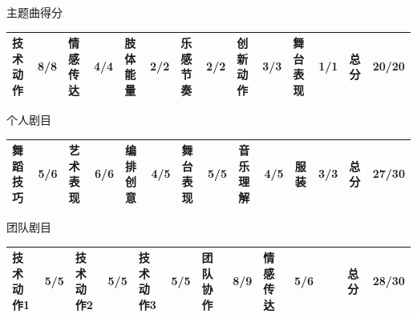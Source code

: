 \documentclass{article}
\begin{document}
\begin{CJK*}{UTF8}{gbsn}
\begin{center}
\vspace{0.5cm}

主题曲得分  
\vspace{0.3cm}

\begin{tabular}{|>{\normalsize}p{}>{\normalsize}p{}|>{\normalsize}p{}>{\normalsize}p{}|>{\normalsize}p{}>{\normalsize}p{}|>{\normalsize}p{}>{\normalsize}p{}|>{\normalsize}p{}>{\normalsize}p{}|>{\normalsize}p{}>{\normalsize}p{}|>{\normalsize}p{}>{\normalsize}p{}|}
    \hline
    \rule{0pt}{2.5ex} 技术动作 & 8/8 & 情感传达 & 4/4 & 肢体能量 & 2/2 & 乐感节奏 & 2/2 & 创新动作 & 3/3 & 舞台表现 & 1/1 & 总分 & \textbf{20/20}\\ \hline

    
\end{tabular}

\vspace{0.5cm}

个人剧目 

\vspace{0.3cm}

\begin{tabular}{|>{\normalsize}p{}>{\normalsize}p{}|>{\normalsize}p{}>{\normalsize}p{}|>{\normalsize}p{}>{\normalsize}p{}|>{\normalsize}p{}>{\normalsize}p{}|>{\normalsize}p{}>{\normalsize}p{}|>{\normalsize}p{}>{\normalsize}p{}|>{\normalsize}p{}>{\normalsize}p{}|}
    \hline
    \rule{0pt}{2.5ex}舞蹈技巧 & 5/6 & 艺术表现 & 6/6 & 编排创意 & 4/5 & 舞台表现 & 5/5 & 音乐理解 & 4/5 & 服装 & 3/3 & 总分 & \textbf{27/30}\\ \hline
    
\end{tabular}
\vspace{0.5cm}

团队剧目

\vspace{0.3cm}

\begin{tabular}{|>{\normalsize}p{}>{\normalsize}p{}|>{\normalsize}p{}>{\normalsize}p{}|>{\normalsize}p{}>{\normalsize}p{}|>{\normalsize}p{}>{\normalsize}p{}|>{\normalsize}p{}>{\normalsize}p{}|>{\normalsize}p{}>{\normalsize}p{}|>{\normalsize}p{}>{\normalsize}p{}|}
    \hline
    \rule{0pt}{2.5ex}技术动作1 & 5/5 & 技术动作2 & 5/5 &技术动作3 & 5/5 &团队协作 & 8/9 & 情感传达 & 5/6 & &    & 总分 & \textbf{28/30}\\ \hline
    

\end{tabular}
\end{center}
\end{CJK*}
\end{document}
